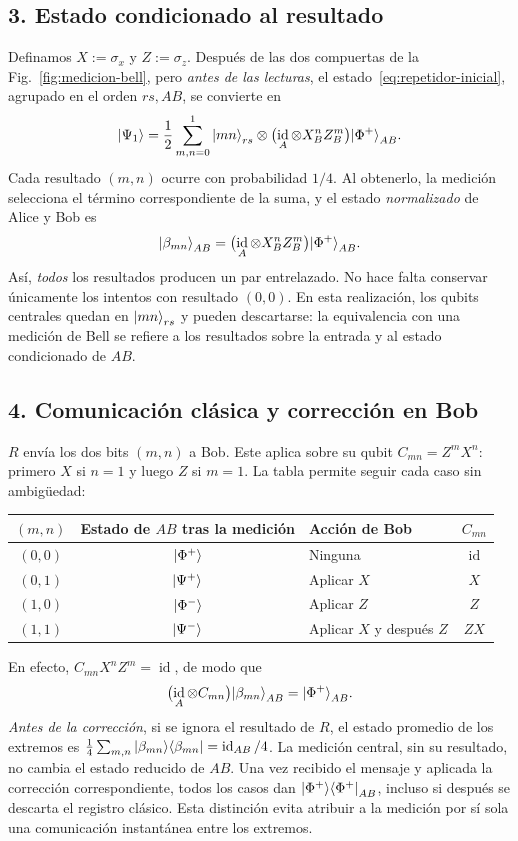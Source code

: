 \documentclass[letterpaper,12pt]{article}
\DeclareMathOperator{\id}{id}
\numberwithin{equation}{section}
\begin{document}
\subsection*{3. Estado condicionado al resultado}
Definamos $X:=\sigma_x$ y $Z:=\sigma_z$. Después de las dos compuertas de
la Fig.~\ref{fig:medicion-bell}, pero \emph{antes de las lecturas}, el
estado~\eqref{eq:repetidor-inicial}, agrupado en el orden $rs,AB$, se convierte en
\begin{equation}
  \ket{\Psi_1}
  =\frac12\sum_{m,n=0}^1\ket{mn}_{rs}\otimes
  \bigl(\id_A\otimes X_B^n Z_B^m\bigr)\ket{\Phi^+}_{AB}.
  \label{eq:swapping-resultados}
\end{equation}
Cada resultado $(m,n)$ ocurre con probabilidad $1/4$. Al obtenerlo, la
medición selecciona el término correspondiente de la suma, y el estado
\emph{normalizado} de Alice y Bob es
\[
  \ket{\beta_{mn}}_{AB}
  =\bigl(\id_A\otimes X_B^n Z_B^m\bigr)\ket{\Phi^+}_{AB}.
\]
Así, \emph{todos} los resultados producen un par entrelazado. No hace
falta conservar únicamente los intentos con resultado $(0,0)$.
En esta realización, los qubits centrales quedan en ${\vert mn \rangle}_{rs}$
y pueden descartarse: la equivalencia con una medición de Bell se refiere
a los resultados sobre la entrada y al estado condicionado de $AB$.

\subsection*{4. Comunicación clásica y corrección en Bob}
$R$ envía los dos bits $(m,n)$ a Bob. Este aplica sobre su qubit
$C_{mn}=Z^mX^n$: primero $X$ si $n=1$ y luego $Z$ si $m=1$.
La tabla permite seguir cada caso sin ambigüedad:
\begin{center}
\begin{tabular}{cclc}
  $(m,n)$ & Estado de $AB$ tras la medición & Acción de Bob & $C_{mn}$\\ \hline
  $(0,0)$ & ${\vert \Phi^+ \rangle}$ & Ninguna & $\id$\\
  $(0,1)$ & ${\vert \Psi^+ \rangle}$ & Aplicar $X$ & $X$\\
  $(1,0)$ & ${\vert \Phi^- \rangle}$ & Aplicar $Z$ & $Z$\\
  $(1,1)$ & ${\vert \Psi^- \rangle}$ & Aplicar $X$ y después $Z$ & $ZX$
\end{tabular}
\end{center}
En efecto, $C_{mn}X^nZ^m=\id$, de modo que
\begin{equation}
  \bigl(\id_A\otimes C_{mn}\bigr)\ket{\beta_{mn}}_{AB}
  =\ket{\Phi^+}_{AB}.
\end{equation}
\emph{Antes de la corrección}, si se ignora el resultado de $R$, el estado
promedio de los extremos es
$\frac14\sum_{m,n}\proj{\beta_{mn}}{\beta_{mn}}=\id_{AB}/4$.
La medición central, sin su resultado, no cambia el estado reducido de
$AB$. Una vez recibido el mensaje y aplicada la corrección correspondiente,
todos los casos dan ${\vert \Phi^+ \rangle \langle \Phi^+ \vert}_{AB}$, incluso si después se
descarta el registro clásico. Esta distinción evita atribuir a la medición
por sí sola una comunicación instantánea entre los extremos.
\end{document}
